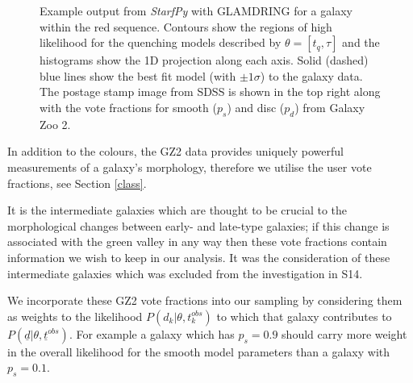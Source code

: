 \documentclass[useAMS,usenatbib]{mn2e}
\def\changed    {\color{titlecol} }
\begin{document}
\begin{figure}
\caption{{\changed Example output from \emph{StarfPy} with GLAMDRING for a galaxy within the red sequence. Contours show the regions of high likelihood for the quenching models described by $\theta = [t_q, \tau]$ and the histograms show the 1D projection along each axis. Solid (dashed) blue lines show the best fit model (with $\pm 1\sigma$) to the galaxy data. The postage stamp image from SDSS is shown in the top right along with the vote fractions for smooth ($p_s$) and disc ($p_d$) from Galaxy Zoo 2.} }
\label{one_example}
\end{figure}

In addition to the colours, the GZ2 data provides uniquely powerful measurements of a galaxy's morphology, therefore we utilise the user vote fractions, see Section \ref{class}. 

It is the intermediate galaxies which are thought to be crucial to the morphological changes between early- and late-type galaxies; if this change is associated with the green valley in any way then these vote fractions contain information we wish to keep in our analysis. It was the consideration of these intermediate galaxies which was excluded from the investigation in S14.


We incorporate these GZ2 vote fractions  into our sampling by considering them as weights to the likelihood $P(d_{k}|\theta, t^{obs}_{k})$ to which that galaxy contributes to $P(\underline{d}|\theta, \underline{t}^{obs})$. For example a galaxy which has $p_{s} = 0.9$ should carry more weight in the {\changed overall likelihood} for the smooth model parameters than a galaxy with $p_{s} = 0.1$. 
\end{document}
